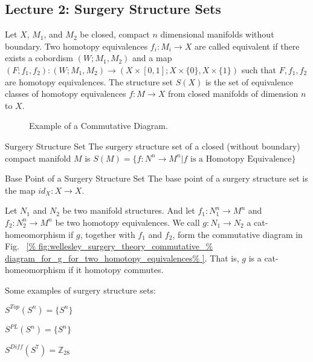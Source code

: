 \documentclass[crop=false,class=book,oneside]{standalone}                      %
\begin{document}
    \subsection{Lecture 2: Surgery Structure Sets}
        Let $X$, $M_{1}$, and $M_{2}$ be closed,
        compact $n$ dimensional manifolds without boundary.
        Two homotopy equivalences $f_{i}:M_{i}\rightarrow X$
        are called equivalent if there exists a cobordism
        $(W;M_{1},M_{2})$ and a map
        $(F;f_{1},f_{2}):(W;M_{1},M_{2})%
         \rightarrow(X\times[0,1];X\times\{0\},X\times\{1\})$
        such that $F,f_{1},f_{2}$ are homotopy equivalences.
        The structure set $S(X)$ is the set of equivalence
        classes of homotopy equivalences $f:M\rightarrow X$
        from closed manifolds of dimension $n$ to $X$.
        \begin{figure}[H]
            \centering
            \captionsetup{type=figure}
            \resizebox{0.3\textwidth}{!}{%
            }
            \caption{Example of a Commutative Diagram.}
            \label{fig:wellesley_surgery_theory_commutative_%
                   diagram_for_g_for_two_homotopy_equivalences}
        \end{figure}
        \begin{ldefinition}{Surgery Structure Set}
            The surgery structure set of a closed
            (without boundary) compact manifold $M$ is
            $S(M)=\{f:N^{n}\rightarrow{M^{n}}|f%
             \textrm{ is a Homotopy Equivalence}\}$
        \end{ldefinition}
        \begin{ldefinition}{Base Point of a Surgery Structure Set}
            The base point of a surgery structure
            set is the map $id_{X}:X\rightarrow X$.
        \end{ldefinition}
        Let $N_{1}$ and $N_{2}$ be two manifold structures.
        And let $f_{1}:N_{1}^{n}\rightarrow M^{n}$ and
        $f_{2}:N_{2}^{n}\rightarrow M^{n}$ be two homotopy
        equivalences. We call $g:N_{1}\rightarrow N_{2}$ a
        cat-homeomorphism if $g$, together with $f_{1}$ and
        $f_{2}$, form the commutative diagram in Fig.~%
        \ref{%
            fig:wellesley_surgery_theory_commutative_%
            diagram_for_g_for_two_homotopy_equivalences%
        }.
        That is, $g$ is a cat-homeomorphism if it
        homotopy commutes.
        \begin{example}
            Some examples of surgery structure sets:
            \begin{enumerate}
                \begin{multicols}{3}
                    \item $S^{Top}(S^{n})=\{S^{n}\}$
                    \item $S^{PL}(S^{n})=\{S^{n}\}$
                    \item $S^{Diff}(S^{7})=\mathbb{Z}_{28}$
                \end{multicols}
            \end{enumerate}
        \end{example}
\end{document}
